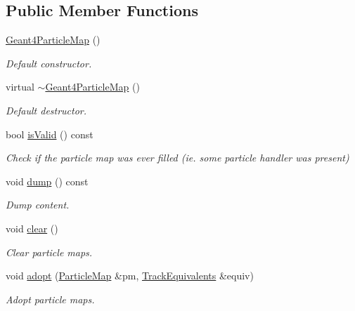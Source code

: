 \subsection*{Public Member Functions}
\begin{DoxyCompactItemize}
\item 
\hyperlink{class_d_d4hep_1_1_simulation_1_1_geant4_particle_map_aeada79751afc2787bc020aff0e413504}{Geant4\+Particle\+Map} ()
\begin{DoxyCompactList}\small\item\em Default constructor. \end{DoxyCompactList}\item 
virtual \hyperlink{class_d_d4hep_1_1_simulation_1_1_geant4_particle_map_ab81a69115c8908be2ae5a2cee23bd80e}{$\sim$\+Geant4\+Particle\+Map} ()
\begin{DoxyCompactList}\small\item\em Default destructor. \end{DoxyCompactList}\item 
bool \hyperlink{class_d_d4hep_1_1_simulation_1_1_geant4_particle_map_afdd0deb9d62fc4321014d2113cb9ee99}{is\+Valid} () const
\begin{DoxyCompactList}\small\item\em Check if the particle map was ever filled (ie. some particle handler was present) \end{DoxyCompactList}\item 
void \hyperlink{class_d_d4hep_1_1_simulation_1_1_geant4_particle_map_af4b8e6d1e0511df8ef271411520cb1cc}{dump} () const
\begin{DoxyCompactList}\small\item\em Dump content. \end{DoxyCompactList}\item 
void \hyperlink{class_d_d4hep_1_1_simulation_1_1_geant4_particle_map_a8a8ea52d779e40d4f41b369a8bc659fe}{clear} ()
\begin{DoxyCompactList}\small\item\em Clear particle maps. \end{DoxyCompactList}\item 
void \hyperlink{class_d_d4hep_1_1_simulation_1_1_geant4_particle_map_a272d5c51f1c4d6d7b526288f99611811}{adopt} (\hyperlink{class_d_d4hep_1_1_simulation_1_1_geant4_particle_map_a065c5fb0629285022b9aa2a628bffef3}{Particle\+Map} \&pm, \hyperlink{class_d_d4hep_1_1_simulation_1_1_geant4_particle_map_aba09f5fcb2dd5874d129660ad4454a21}{Track\+Equivalents} \&equiv)
\begin{DoxyCompactList}\small\item\em Adopt particle maps. \end{DoxyCompactList}\item 

\end{DoxyCompactItemize}
